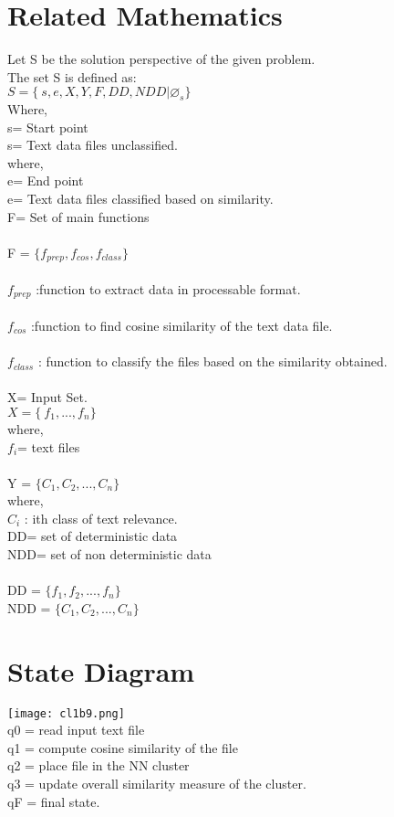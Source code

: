 \documentclass[10pt,a4paper]{article}
\begin{document}
\section{Related Mathematics}
Let S be the solution perspective of the given problem.
\\The set S is defined as:
\\$S=\lbrace\ s,e,X,Y,F,DD,NDD|\varnothing_{s}\rbrace$
\\Where,
\\s= Start point 
\\s= Text data files unclassified.
\\where,
\\e= End point 
\\e= Text data files classified based on similarity.
\\F= Set of main functions
\\\\ F = $\lbrace f_{prep}, f_{cos}, f_{class} \rbrace$
\\\\$f_{prep}$  :function to extract data in processable format.
\\\\ $f_{cos}$ :function to find cosine similarity of the text data file.
\\\\ $f_{class}$ : function to classify the files based on the similarity obtained.
\\\\X= Input Set.
\\$X=\lbrace\ f_{1},...,f_{n}\rbrace$
\\where,
\\$f_{i}$= text files
\\\\ Y = $\lbrace C_{1}, C_{2},...,C_{n} \rbrace$
\\where,
\\$C_{i}$ : ith class of text relevance.
\\DD= set of deterministic data
\\NDD= set of non deterministic data
\\\\ DD = $\lbrace f_{1},f_{2},...,f_{n}\rbrace$
\\ NDD = $\lbrace C_{1}, C_{2},...,C_{n} \rbrace$


\section{State Diagram}
\texttt{[image: cl1b9.png]}
\\q0 = read input text file
\\q1 = compute cosine similarity of the file
\\q2 = place file in the NN cluster
\\q3 = update overall similarity measure of the cluster.
\\qF = final state.
\end{document}
